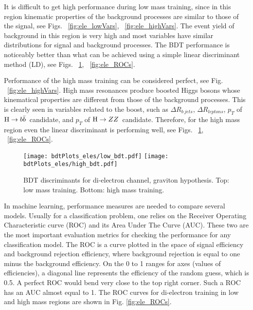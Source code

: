 It is difficult to get high performance during low mass training, since
in this region kinematic properties of the background processes are similar to those of the signal, see Figs. ~\ref{fig:ele_lowVars}, ~\ref{fig:ele_highVars}. The event yield of background in this region is very high and most variables have similar distributions for signal and background processes. The BDT performance is noticeably better than what can be achieved using a simple linear discriminant method (LD), see Figs. ~\ref{fig:ele_BDTs}, ~\ref{fig:ele_ROCs}.

Performance of the high mass training can be considered perfect, see Fig. ~\ref{fig:ele_highVars}. High mass resonances produce boosted Higgs bosons whose kinematical properties are different from those of the background processes. This is clearly seen in variables related to the boost, such as $\Delta R_{b\ jets}$, $\Delta R_{leptons}$, $p_T$ of $\mathrm{H}\to b\bar{b}$~candidate, and $p_T$ of $\mathrm{H}\rightarrow ZZ$~candidate. Therefore, for the high mass region even the linear
discriminant is performing well, see Figs. ~\ref{fig:ele_BDTs}, ~\ref{fig:ele_ROCs}.

\begin{figure}[H]
\begin{center}
\texttt{[image: bdtPlots\_eles/low\_bdt.pdf]}
\texttt{[image: bdtPlots\_eles/high\_bdt.pdf]}
\caption[BDT discriminants for di-electron channel, graviton hypothesis.]{ BDT discriminants for di-electron channel, graviton hypothesis. Top: low mass training. Bottom: high mass training. }
\label{fig:ele_BDTs}
\end{center}
\end{figure}

In machine learning, performance measures are needed to compare several models. Usually for a classification problem, one relies on the Receiver Operating Characteristic curve (ROC) and its Area Under The Curve (AUC). These two are the most important evaluation metrics for checking the performance for any classification model. The ROC is a curve plotted in the space of signal efficiency and background rejection efficiency, where background rejection is equal to one minus the background efficiency. On the 0 to 1 ranges for axes (values of efficiencies), a diagonal line represents the efficiency of the random guess, which is 0.5. A perfect ROC would bend very close to the top right corner. Such a ROC has an AUC almost equal to 1. The ROC curves for di-electron training in low and high mass regions are shown in Fig. \ref{fig:ele_ROCs}. 

